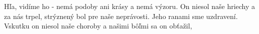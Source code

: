 Hľa, vidíme ho - nemá podoby ani krásy a nemá výzoru.
On niesol naše hriechy
a za nás trpel,
strýznený bol pre naše neprávosti.
\versseparator
Jeho ranami sme uzdravení.
\versseparator
Vskutku on niesol naše choroby
a našimi bôľmi sa on obťažil,
